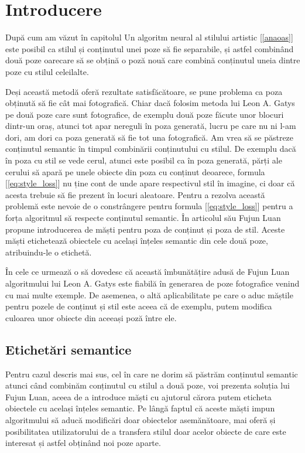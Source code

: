 \section{Introducere}
După cum am văzut în capitolul Un algoritm neural al stilului artistic [\ref{anaoas}] este posibil ca stilul și conținutul unei poze să fie separabile, și astfel combinând două poze oarecare să se obțină o poză nouă care combină conținutul uneia dintre poze cu stilul celeilalte.

Deși această metodă oferă rezultate satisfăcătoare, se pune problema ca poza obținută să fie cât mai fotografică. Chiar dacă folosim metoda lui Leon A. Gatys pe două poze care sunt fotografice, de exemplu două poze făcute unor blocuri dintr-un oraș, atunci tot apar nereguli în poza generată, lucru pe care nu ni l-am dori, am dori ca poza generată să fie tot una fotografică. Am vrea să se păstreze conținutul semantic în timpul combinării conținutului cu stilul. De exemplu dacă în poza cu stil se vede cerul, atunci este posibil ca în poza generată, părți ale cerului să apară pe unele obiecte din poza cu conținut deoarece, formula [\ref{eq:style_loss}] nu ține cont de unde apare respectivul stil în imagine, ci doar că acesta trebuie să fie prezent în locuri aleatoare. Pentru a rezolva această problemă este nevoie de o constrângere pentru formula [\ref{eq:style_loss}] pentru a forța algoritmul să respecte conținutul semantic. În articolul său \cite{luan2017} Fujun Luan propune introducerea de măști pentru poza de conținut și poza de stil. Aceste măști etichetează obiectele cu același înțeles semantic din cele două poze, atribuindu-le o etichetă.

În cele ce urmează o să dovedesc că această îmbunătățire adusă de Fujun Luan algoritmului lui Leon A. Gatys este fiabilă în generarea de poze fotografice venind cu mai multe exemple. De asemenea, o altă aplicabilitate pe care o aduc măștile pentru pozele de conținut și stil este aceea că de exemplu, putem modifica culoarea unor obiecte din aceeași poză între ele.

\subsection{Etichetări semantice}
\label{semantic_segmentation}
Pentru cazul descris mai sus, cel în care ne dorim să păstrăm conținutul semantic atunci când combinăm conținutul cu stilul a două poze, voi prezenta soluția lui Fujun Luan, aceea de a introduce măști cu ajutorul cărora putem eticheta obiectele cu același înțeles semantic. Pe lângă faptul că aceste măști impun algoritmului să aducă modificări doar obiectelor asemănătoare, mai oferă și posibilitatea utilizatorului de a transfera stilul doar acelor obiecte de care este interesat și astfel obținând noi poze aparte.

